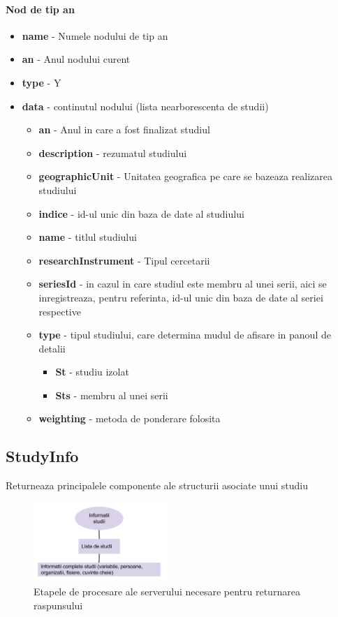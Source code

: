 \paragraph{Nod de tip an}
\begin{itemize}
\item \textbf{name} - Numele nodului de tip an 
\item \textbf{an} - Anul nodului curent 
\item \textbf{type} - Y 
\item \textbf{data} - continutul nodului (lista nearborescenta de studii) 

\begin{itemize}
\item \textbf{an} - Anul in care a fost finalizat studiul 
\item \textbf{description} - rezumatul studiului 
\item \textbf{geographicUnit} - Unitatea geografica pe care se bazeaza realizarea
studiului 
\item \textbf{indice} - id-ul unic din baza de date al studiului 
\item \textbf{name} - titlul studiului 
\item \textbf{researchInstrument} - Tipul cercetarii 
\item \textbf{seriesId} - in cazul in care studiul este membru al unei serii,
aici se inregistreaza, pentru referinta, id-ul unic din baza de date
al seriei respective 
\item \textbf{type} - tipul studiului, care determina mudul de afisare in
panoul de detalii 

\begin{itemize}
\item \textbf{St} - studiu izolat 
\item \textbf{Sts} - membru al unei serii 
\end{itemize}
\item \textbf{weighting} - metoda de ponderare folosita 
\end{itemize}
\end{itemize}

\subsection{StudyInfo}

Returneaza principalele componente ale structurii asociate unui studiu

\begin{figure}[H]
\begin{centering}
\includegraphics[width=5cm]{img/studyinfo}
\par\end{centering}
\caption{Etapele de procesare ale serverului necesare pentru returnarea raspunsului}
\end{figure}

